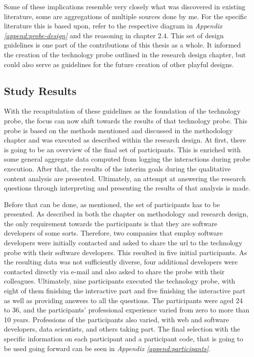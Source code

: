 Some of these implications resemble very closely what was discovered in existing literature, some are aggregations of multiple sources done by me. For the specific literature this is based upon, refer to the respective diagram in \textit{Appendix \ref{append:probe-design}} and the reasoning in chapter 2.4. This set of design guidelines is one part of the contributions of this thesis as a whole. It informed the creation of the technology probe outlined in the research design chapter, but could also serve as guidelines for the future creation of other playful designs.

\subsection{Study Results}

With the recapitulation of these guidelines as the foundation of the technology probe, the focus can now shift towards the results of that technology probe. This probe is based on the methods mentioned and discussed in the methodology chapter and was executed as described within the research design. At first, there is going to be an overview of the final set of participants. This is enriched with some general aggregate data computed from logging the interactions during probe execution. After that, the results of the interim goals during the qualitative content analysis are presented. Ultimately, an attempt at answering the research questions through interpreting and presenting the results of that analysis is made.

Before that can be done, as mentioned, the set of participants has to be presented. As described in both the chapter on methodology and research design, the only requirement towards the participants is that they are software developers of some sorts. Therefore, two companies that employ software developers were initially contacted and asked to share the \gls{url} to the technology probe with their software developers. This resulted in five initial participants. As the resulting data was not sufficiently diverse, four additional developers were contacted directly via e-mail and also asked to share the probe with their colleagues. Ultimately, nine participants executed the technology probe, with eight of them finishing the interactive part and five finishing the interactive part as well as providing answers to all the questions. The participants were aged 24 to 36, and the participants' professional experience varied from zero to more than 10 years. Professions of the participants also varied, with web and software developers, data scientists, and others taking part. The final selection with the specific information on each participant and a participant code, that is going to be used going forward can be seen in \textit{Appendix \ref{append:participants}}.

